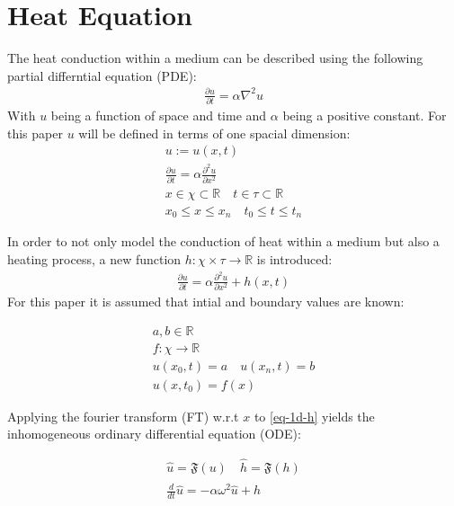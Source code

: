 \section{Heat Equation}
The heat conduction within a medium can be described using the following partial differntial equation (PDE):
\begin{gather}
\frac{\partial u}{\partial t} = \alpha \nabla^{2} u
\end{gather}
With \(u\) being a function of space and time and \(\alpha\) being a positive constant.
For this paper \(u\) will be defined in terms of one spacial dimension:
\begin{gather}
u := u(x, t) \\
\frac{\partial u}{\partial t} = \alpha \frac{\partial^{2} u}{\partial x^{2}} \\
x \in \chi \subset \mathbb{R} \quad t \in \tau \subset \mathbb{R} \\
x_{0} \leq x \leq x_{n} \quad t_{0} \leq t \leq t_{n} 
\end{gather}
\cite{Gustafsson2011}

In order to not only model the conduction of heat within a medium but also a heating process, a new function \(h: \chi \times \tau \rightarrow  \mathbb{R}\) is introduced:
\begin{gather}
\frac{\partial u}{\partial t} = \alpha \frac{\partial^{2} u}{\partial x^{2}} + h(x,t) \label{eq-1d-h}
\end{gather}
For this paper it is assumed that intial and boundary values are known:

\begin{gather}
a, b \in \mathbb{R} \\
f: \chi \rightarrow \mathbb{R} \\
u(x_{0}, t) = a \quad u(x_{n}, t) = b \\
u(x, t_{0}) = f(x) 
\end{gather} 

Applying the fourier transform (FT) w.r.t \(x\) to \ref{eq-1d-h} yields the inhomogeneous ordinary differential equation (ODE):

\begin{gather}
\hat{u} = \mathfrak{F}(u) \quad \hat{h} = \mathfrak{F}(h) \\
\frac{d}{dt} \hat{u} = -\alpha\omega^{2}\hat{u} + \hat{h} \label{eq-1d-h-ft}
\end{gather}


